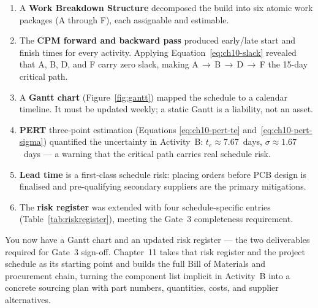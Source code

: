 \begin{enumerate}
  \item A \textbf{Work Breakdown Structure} decomposed the build into
        six atomic work packages (A through F), each assignable and
        estimable.
  \item The \textbf{CPM forward and backward pass} produced early/late
        start and finish times for every activity.
        Applying Equation~\ref{eq:ch10-slack} revealed that A, B, D,
        and F carry zero slack, making
        \mbox{A\,$\to$\,B\,$\to$\,D\,$\to$\,F} the 15-day critical path.
  \item A \textbf{Gantt chart} (Figure~\ref{fig:gantt}) mapped the
        schedule to a calendar timeline.
        It must be updated weekly; a static Gantt is a liability, not an
        asset.
  \item \textbf{PERT} three-point estimation (Equations
        \ref{eq:ch10-pert-te} and~\ref{eq:ch10-pert-sigma}) quantified
        the uncertainty in Activity~B: $t_e \approx 7.67$~days,
        $\sigma \approx 1.67$~days — a warning that the critical path
        carries real schedule risk.
  \item \textbf{Lead time} is a first-class schedule risk: placing orders
        before PCB design is finalised and pre-qualifying secondary
        suppliers are the primary mitigations.
  \item The \textbf{risk register} was extended with four
        schedule-specific entries (Table~\ref{tab:riskregister}),
        meeting the Gate~3 completeness requirement.
\end{enumerate}

You now have a Gantt chart and an updated risk register — the two
deliverables required for Gate~3 sign-off.
Chapter~11 takes that risk register and the project schedule as its
starting point and builds the full Bill of Materials and procurement
chain, turning the component list implicit in Activity~B into a
concrete sourcing plan with part numbers, quantities, costs, and
supplier alternatives.
